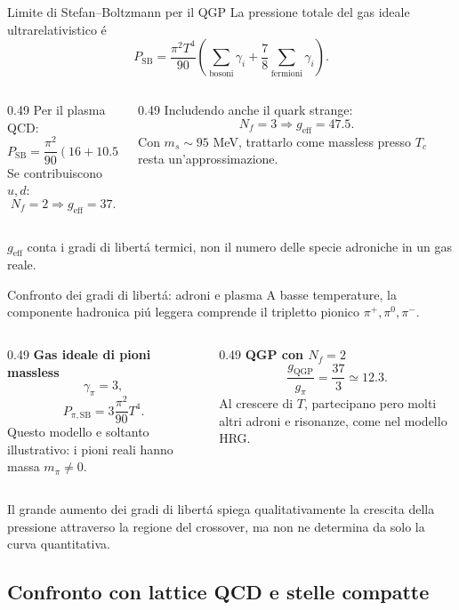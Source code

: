 \begin{frame}{Limite di Stefan--Boltzmann per il QGP}
\small
La pressione totale del gas ideale ultrarelativistico \'e
\[
P_{\mathrm{SB}}=\frac{\pi^2T^4}{90}
\left(\sum_{\mathrm{bosoni}}\gamma_i+
\frac78\sum_{\mathrm{fermioni}}\gamma_i\right).
\]
\begin{columns}[T,onlytextwidth]
\begin{column}{0.49\textwidth}
Per il plasma QCD:
\[
P_{\mathrm{SB}}=\frac{\pi^2}{90}
(16+10.5N_f)T^4.
\]
Se contribuiscono $u,d$:
\[
N_f=2\Rightarrow g_{\mathrm{eff}}=37.
\]
\end{column}
\begin{column}{0.49\textwidth}
Includendo anche il quark strange:
\[
N_f=3\Rightarrow g_{\mathrm{eff}}=47.5.
\]
Con $m_s\sim95$ MeV, trattarlo come
massless presso $T_c$ resta
un'approssimazione.
\end{column}
\end{columns}
\medskip
$g_{\mathrm{eff}}$ conta i gradi di libert\'a termici,
non il numero delle specie adroniche in un gas reale.
\end{frame}

\begin{frame}{Confronto dei gradi di libert\'a: adroni e plasma}
\small
A basse temperature, la componente hadronica pi\'u leggera
comprende il tripletto pionico $\pi^+,\pi^0,\pi^-$.
\begin{columns}[T,onlytextwidth]
\begin{column}{0.49\textwidth}
\textbf{Gas ideale di pioni massless}
\[
\gamma_\pi=3,
\]
\[
P_{\pi,\mathrm{SB}}=3\frac{\pi^2}{90}T^4.
\]
Questo modello e soltanto illustrativo:
i pioni reali hanno massa $m_\pi\ne0$.
\end{column}
\begin{column}{0.49\textwidth}
\textbf{QGP con $N_f=2$}
\[
\frac{g_{\mathrm{QGP}}}{g_{\pi}}=
\frac{37}{3}\simeq12.3.
\]
Al crescere di $T$, partecipano pero
molti altri adroni e risonanze,
come nel modello HRG.
\end{column}
\end{columns}
\medskip
Il grande aumento dei gradi di libert\'a spiega
qualitativamente la crescita della pressione attraverso
la regione del crossover, ma non ne determina da solo
la curva quantitativa.
\end{frame}

\subsection{Confronto con lattice QCD e stelle compatte}

